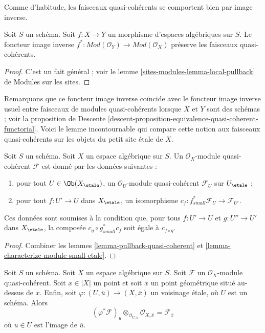 \medskip\noindent
Comme d'habitude, les faisceaux quasi-cohérents se comportent bien par image inverse.

\begin{lemma}
\label{lemma-pullback-quasi-coherent}
Soit $S$ un schéma.
Soit $f : X \to Y$ un morphisme d'espaces algébriques sur $S$.
Le foncteur image inverse
$f^* : \textit{Mod}(\mathcal{O}_Y) \to \textit{Mod}(\mathcal{O}_X)$
préserve les faisceaux quasi-cohérents.
\end{lemma}

\begin{proof}
C'est un fait général ; voir le
lemme \ref{sites-modules-lemma-local-pullback} de Modules sur les sites.
\end{proof}

\noindent
Remarquons que ce foncteur image inverse coïncide avec le foncteur image inverse usuel
entre faisceaux de modules quasi-cohérents lorsque $X$ et $Y$ sont des
schémas ; voir la
proposition de Descente
\ref{descent-proposition-equivalence-quasi-coherent-functorial}.
Voici le lemme incontournable qui compare cette notion aux faisceaux quasi-cohérents
sur les objets du petit site \'etale de $X$.

\begin{lemma}
\label{lemma-characterize-quasi-coherent-small-etale}
Soit $S$ un schéma. Soit $X$ un espace algébrique sur $S$.
Un $\mathcal{O}_X$-module quasi-cohérent $\mathcal{F}$
est donné par les données suivantes :
\begin{enumerate}
\item pour tout $U \in \Ob(X_\etale)$, un
$\mathcal{O}_U$-module quasi-cohérent $\mathcal{F}_U$ sur $U_\etale$ ;
\item pour tout $f : U' \to U$ dans $X_\etale$, un isomorphisme
$c_f : f_{small}^*\mathcal{F}_U \to \mathcal{F}_{U'}$.
\end{enumerate}
Ces données sont soumises à la condition que, pour tous $f : U' \to U$
et $g : U'' \to U'$ dans $X_\etale$, la composée
$c_g \circ g_{small}^*c_f$ soit égale à $c_{f \circ g}$.
\end{lemma}

\begin{proof}
Combiner les lemmes \ref{lemma-pullback-quasi-coherent} et
\ref{lemma-characterize-module-small-etale}.
\end{proof}

\begin{lemma}
\label{lemma-stalk-quasi-coherent}
Soit $S$ un schéma.
Soit $X$ un espace algébrique sur $S$.
Soit $\mathcal{F}$ un $\mathcal{O}_X$-module quasi-cohérent.
Soit $x \in |X|$ un point et soit $\overline{x}$ un point
géométrique situé au-dessus de $x$. Enfin, soit
$\varphi : (U, \overline{u}) \to (X, \overline{x})$
un voisinage \'etale, où $U$ est un schéma.
Alors
$$
(\varphi^*\mathcal{F})_u \otimes_{\mathcal{O}_{U, u}}
\mathcal{O}_{X, \overline{x}} =
\mathcal{F}_{\overline{x}}
$$
où $u \in U$ est l'image de $\overline{u}$.
\end{lemma}

